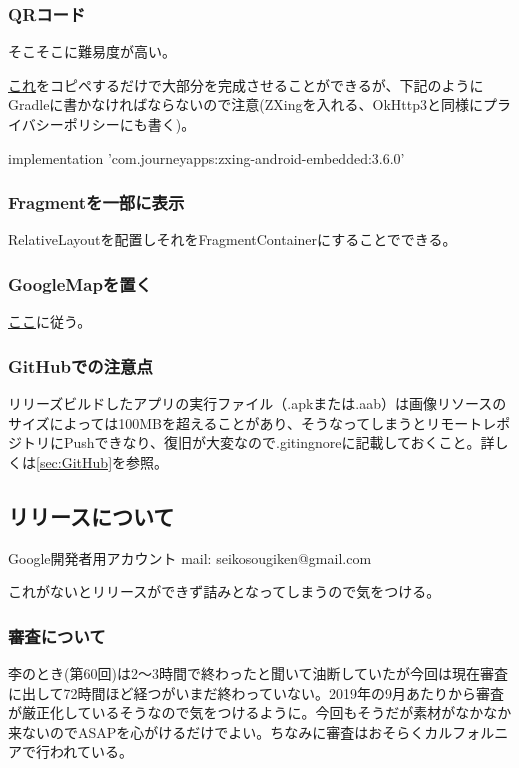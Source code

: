 \documentclass[a4paper]{ltjsreport}
\newcommand{\link}[2]{\href{#2}{#1}}
\begin{document}
\subsubsection{QRコード}
そこそこに難易度が高い。\par
\link{これ}{https://github.com/SeikoStudentCouncil/SeikoFestaAndroidApp62nd/blob/master/app/src/main/java/jp/ac/seiko/itec/seikofestaapp62nd/fragments/treasurehunt/QRCodeFragment.kt}をコピペするだけで大部分を完成させることができるが、下記のようにGradleに書かなければならないので注意(ZXingを入れる、OkHttp3と同様にプライバシーポリシーにも書く)。\par
implementation 'com.journeyapps:zxing-android-embedded:3.6.0'
\subsubsection{Fragmentを一部に表示}
RelativeLayoutを配置しそれをFragmentContainerにすることでできる。
\subsubsection{GoogleMapを置く}
\link{ここ}{https://developers.google.com/maps/documentation/android-sdk/start?hl=ja}に従う。
\subsubsection{GitHubでの注意点}
リリーズビルドしたアプリの実行ファイル（.apkまたは.aab）は画像リソースのサイズによっては100MBを超えることがあり、そうなってしまうとリモートレポジトリにPushできなり、復旧が大変なので.gitingnoreに記載しておくこと。詳しくは\ref{sec:GitHub}を参照。
\subsection{リリースについて}
\begin{itembox}[l]{Google開発者用アカウント}
  \color{red}
  mail: seikosougiken@gmail.com\\
\end{itembox}
これがないとリリースができず詰みとなってしまうので気をつける。
\subsubsection{審査について}
李のとき(第60回)は2～3時間で終わったと聞いて油断していたが今回は現在審査に出して72時間ほど経つがいまだ終わっていない。2019年の9月あたりから審査が厳正化しているそうなので気をつけるように。今回もそうだが素材がなかなか来ないのでASAPを心がけるだけでよい。ちなみに審査はおそらくカルフォルニアで行われている。
\end{document}
